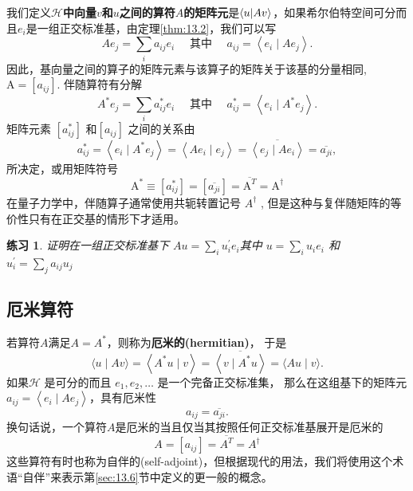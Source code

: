 \documentclass[hyperref,UTF8]{ctexbook}
\newtheorem*{exercise}{练习}
\begin{document}
我们定义\textbf{\(\mathcal{H}\)中向量\(v\)和\(u\)之间的算符\(A\)的矩阵元}是\(\braket{u|Av}\)，如果希尔伯特空间可分而且\(e_i\)是一组正交标准基，由定理\ref{thm:13.2}，我们可以写
$$
A e_{j}=\sum_{i} a_{i j} e_{i} \quad \text { 其中 } \quad a_{i j}=\left\langle e_{i} \mid A e_{j}\right\rangle .
$$
因此，基向量之间的算子的矩阵元素与该算子的矩阵关于该基的分量相同, $\mathrm{A}=\left[a_{i j}\right]$. 伴随算符有分解
$$
A^{*} e_{j}=\sum_{i} a_{i j}^{*} e_{i} \quad \text { 其中 } \quad a_{i j}^{*}=\left\langle e_{i} \mid A^{*} e_{j}\right\rangle .
$$
矩阵元素 $\left[a_{i j}^{*}\right]$ 和$\left[a_{i j}\right]$ 之间的关系由
$$
a_{i j}^{*}=\left\langle e_{i} \mid A^{*} e_{j}\right\rangle=\left\langle A e_{i} \mid e_{j}\right\rangle=\overline{\left\langle e_{j} \mid A e_{i}\right\rangle}=\overline{a_{j i}},
$$
所决定，或用矩阵符号
$$
\mathrm{A}^{*} \equiv\left[a_{i j}^{*}\right]=\left[\overline{a_{j i}}\right]=\overline{\mathrm{A}^{T}}=\mathrm{A}^{\dagger}
$$
在量子力学中，伴随算子通常使用共轭转置记号 $A^{\dagger}$ , 但是这种与复伴随矩阵的等价性只有在正交基的情形下才适用。
\begin{exercise}
 证明在一组正交标准基下 $A u=\sum_{i} u_{i}^{\prime} e_{i} $其中 $u=\sum_{i} u_{i} e_{i} $ 和 $ u_{i}^{\prime}=\sum_{j} a_{i j} u_{j} $
\end{exercise}
\subsection{厄米算符}
若算符$A$满足$A=A^{*}$，则称为\textbf{厄米的(hermitian)}， 于是
$$
\langle u \mid A v\rangle=\left\langle A^{*} u \mid v\right\rangle=\overline{\left\langle v \mid A^{*} u\right\rangle}=\langle A u \mid v\rangle .
$$
如果$\mathcal{H}$ 是可分的而且 $e_{1}, e_{2}, \ldots$ 是一个完备正交标准集， 那么在这组基下的矩阵元$a_{i j}=\left\langle e_{i} \mid A e_{j}\right\rangle$，具有厄米性
$$
a_{i j}=\overline{a_{j i}} .
$$
换句话说，一个算符$A$是厄米的当且仅当其按照任何正交标准基展开是厄米的
$$
A=\left[a_{i j}\right]=\overline{A^{T}}=A^{\dagger}
$$
这些算符有时也称为自伴的(self-adjoint)，但根据现代的用法，我们将使用这个术语“自伴”来表示第\ref{sec:13.6}节中定义的更一般的概念。
\end{document}
